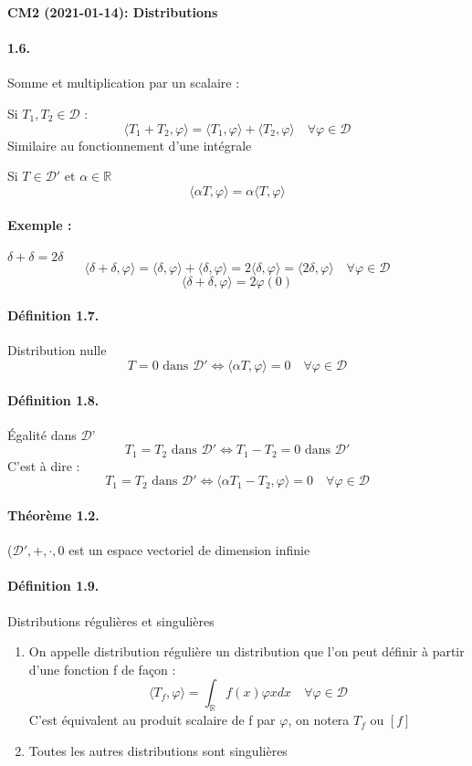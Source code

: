 \documentclass[12pt,a4paper]{report}
\newcommand{\ens}[1]{\mathbb{#1}}
\newcommand{\D}{\ensuremath{\mathcal{D}}}
\begin{document}
\begin{center}
\textbf{CM2 (2021-01-14): Distributions}
\end{center}

\paragraph{1.6.} Somme et multiplication par un scalaire :

Si \(T_1, T_2 \in \D\) :
\[
	\langle T_1 + T_2, \varphi \rangle = \langle T_1, \varphi \rangle + \langle T_2, \varphi \rangle \quad \forall \varphi \in \D
\]Similaire au fonctionnement d'une intégrale

Si \(T \in \D' \text{ et } \alpha \in \ens{R}\)
\[
	\langle \alpha T, \varphi \rangle = \alpha \langle T, \varphi \rangle
\]

\paragraph{Exemple :} \(\delta + \delta = 2\delta\)
\[
	\langle \delta + \delta, \varphi \rangle = \langle \delta, \varphi \rangle + \langle \delta, \varphi \rangle = 2 \langle \delta, \varphi \rangle =  \langle 2\delta, \varphi \rangle \quad \forall \varphi \in \D
\]
\[
	\langle \delta + \delta, \varphi \rangle = 2 \varphi(0)
\]
\paragraph{Définition 1.7.} Distribution nulle
\[
	T = 0 \text{ dans } \D' \Leftrightarrow \langle \alpha T, \varphi \rangle = 0\quad \forall \varphi \in \D
\]

\paragraph{Définition 1.8.} Égalité dans \D'
\[
	T_1 = T_2 \text{ dans } \D' \Leftrightarrow T_1 - T_2 = 0 \text{ dans } \D'
\]
C'est à dire :
\[
	T_1 = T_2 \text{ dans } \D' \Leftrightarrow \langle \alpha T_1 - T_2, \varphi \rangle = 0\quad \forall \varphi \in \D
\]

\paragraph{Théorème 1.2.} (\(\D',+, \cdot, 0\) est un espace vectoriel de dimension infinie

\paragraph{Définition 1.9.} Distributions régulières et singulières
\begin{enumerate}
	\item On appelle distribution régulière un distribution que l'on peut définir à partir d'une fonction f de façon :
	\[
		\langle T_f, \varphi \rangle = \int_{\ens{R}} f(x) \varphi{x} dx \quad \forall \varphi \in \D
	\]
	C'est équivalent au produit scalaire de f par \(\varphi\), on notera \(T_f\) ou \([f]\)
	\item Toutes les autres distributions sont singulières
\end{enumerate}
\end{document}
